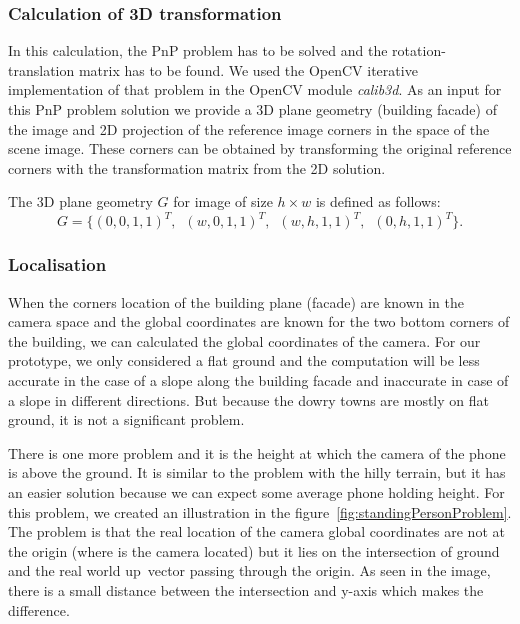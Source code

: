 \documentclass[thesis=B,english]{FITthesis}[2019/12/23]
\begin{document}
            \subsubsection*{Calculation of 3D transformation}
                In this calculation, the PnP problem has to be solved and the rotation-translation matrix has to be found. We used the OpenCV iterative implementation of that problem in the OpenCV module \textit{calib3d}. As an input for this PnP problem solution we provide a 3D plane geometry (building facade) of the image and 2D projection of the reference image corners in the space of the scene image. These corners can be obtained by transforming the original reference corners with the transformation matrix from the 2D solution.
                
                The 3D plane geometry \(G\) for image of size \(h\times w\) is defined as follows:
                \begin{equation}
                   G = \{(0, 0, 1, 1)^T, \enspace (w, 0, 1, 1)^T, \enspace (w, h, 1, 1)^T, \enspace (0, h, 1, 1)^T\}.
                \end{equation}
                
            \subsubsection*{Localisation}
                When the corners location of the building plane (facade) are known in the camera space and the global coordinates are known for the two bottom corners of the building, we can calculated the global coordinates of the camera. For our prototype, we only considered a flat ground and the computation will be less accurate in the case of a slope along the building facade and inaccurate in case of a slope in different directions. But because the dowry towns are mostly on flat ground, it is not a significant problem.  
                
                There is one more problem and it is the height at which the camera of the phone is above the ground. It is similar to the problem with the hilly terrain, but it has an easier solution because we can expect some average phone holding height. For this problem, we created an illustration in the figure~\ref{fig:standingPersonProblem}. The problem is that the real location of the camera global coordinates are not at the origin (where is the camera located) but it lies on the intersection of ground and the real world up~vector passing through the origin. As seen in the image, there is a small distance between the intersection and y-axis which makes the difference.
                
\end{document}

